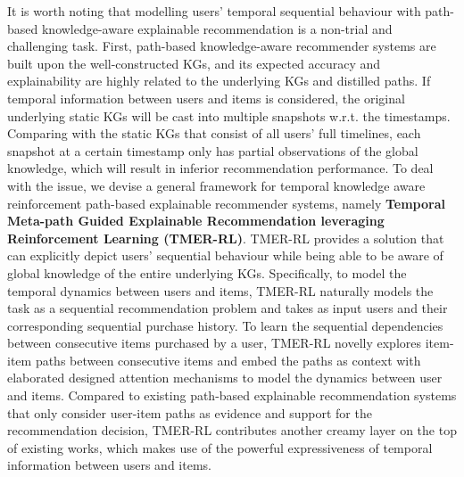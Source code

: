 It is worth noting that modelling users' temporal sequential behaviour with path-based knowledge-aware explainable recommendation is a non-trial and challenging task. First, path-based knowledge-aware recommender systems are built upon the well-constructed KGs, and its expected accuracy and explainability are highly related to the underlying KGs and distilled paths. If temporal information between users and items is considered, the original underlying static KGs will be cast into multiple snapshots w.r.t. the timestamps. Comparing with the static KGs that consist of all users' full timelines, each snapshot at a certain timestamp only has partial observations of the global knowledge, which will result in inferior recommendation performance. To deal with the issue, we devise a general framework for temporal knowledge aware reinforcement path-based explainable recommender systems, namely \textbf{Temporal Meta-path Guided Explainable Recommendation leveraging Reinforcement Learning (TMER-RL)}. TMER-RL provides a solution that can explicitly depict users' sequential behaviour while being able to be aware of global knowledge of the entire underlying KGs. Specifically, to model the temporal dynamics between users and items, TMER-RL naturally models the task as a sequential recommendation problem and takes as input users and their corresponding sequential purchase history. To learn the sequential dependencies between consecutive items purchased by a user, TMER-RL novelly explores item-item paths between consecutive items and embed the paths as context with elaborated designed attention mechanisms to model the dynamics between user and items. Compared to existing path-based explainable recommendation systems that only consider user-item paths as evidence and support for the recommendation decision, TMER-RL contributes another creamy layer on the top of existing works, which makes use of the powerful expressiveness of temporal information between users and items. 



